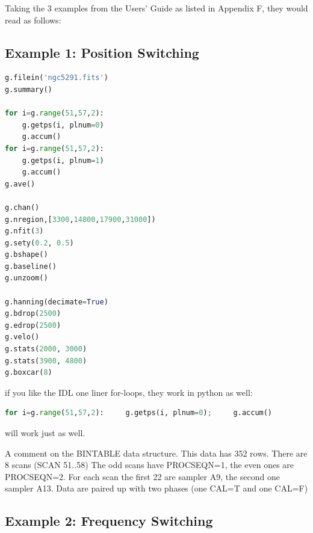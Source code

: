 \documentclass[12pt,a4paper]{article}
\begin{document}
\noindent    
Taking the 3 examples from the Users' Guide as listed in Appendix F,
they would read as follows:

\subsection{Example 1:   Position Switching}

\begin{lstlisting}[language=python]
g.filein('ngc5291.fits')
g.summary()

for i=g.range(51,57,2):
    g.getps(i, plnum=0)
    g.accum()
for i=g.range(51,57,2):
    g.getps(i, plnum=1)
    g.accum()
g.ave()

g.chan()
g.nregion,[3300,14800,17900,31000])
g.nfit(3)
g.sety(0.2, 0.5)
g.bshape()
g.baseline()
g.unzoom()

g.hanning(decimate=True)
g.bdrop(2500)
g.edrop(2500)
g.velo()
g.stats(2000, 3000)
g.stats(3900, 4800)
g.boxcar(8)
\end{lstlisting}

if you like the IDL one liner for-loops, they work in python as well:

\begin{lstlisting}[language=python]
  for i=g.range(51,57,2):     g.getps(i, plnum=0);     g.accum()
\end{lstlisting}

will work just as well.

A comment on the BINTABLE data structure. This data has 352 rows. There are 8 scans (SCAN 51..58) The odd scans
have PROCSEQN=1, the even ones are PROCSEQN=2.  For each scan the first 22 are sampler A9, the second one sampler A13.
Data are paired up with two phases (one CAL=T and one CAL=F)

\subsection{Example 2: Frequency Switching}
\end{document}
